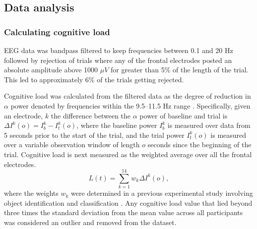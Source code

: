 \documentclass{article}
\begin{document}
	
	
	
	\subsection{Data analysis}
	\subsubsection{Calculating cognitive load}
	EEG data was bandpass filtered to keep frequencies between 0.1 and 20 Hz followed by rejection of trials where any of the frontal electrodes posted an absolute amplitude above 1000 $\mu V$ for greater than 5\% of the length of the trial. This led to approximately 6\% of the trials getting rejected.  
	
	Cognitive load was calculated from the filtered data as the degree of reduction in $\alpha$ power denoted by frequencies within the 9.5--11.5 Hz range \cite{arunimCogLoad,Klimesch1999}. Specifically, given an electrode, $k$ the difference between the $\alpha$ power of baseline and trial is $\Delta I^{k}(o) = I_b ^{k} - I_t ^{k}(o)$, where the baseline power $I_b^k$ is measured over data from 5 seconds prior to the start of the trial, and the trial power $I_t^k(o)$ is measured over a variable observation window of length $o$ seconds since the beginning of the trial. Cognitive load is next measured as the weighted average over all the frontal electrodes.
	\begin{equation}
		L(t) = \sum_{k=1}^{14}w_k\Delta I^k(o),
	\end{equation}
	where the weights $w_k$ were determined in a previous experimental study involving object identification and classification \cite{arunimCogLoad}. Any cognitive load value that lied beyond three times the standard deviation from the mean value across all participants was considered an outlier and removed from the dataset.
\end{document}
